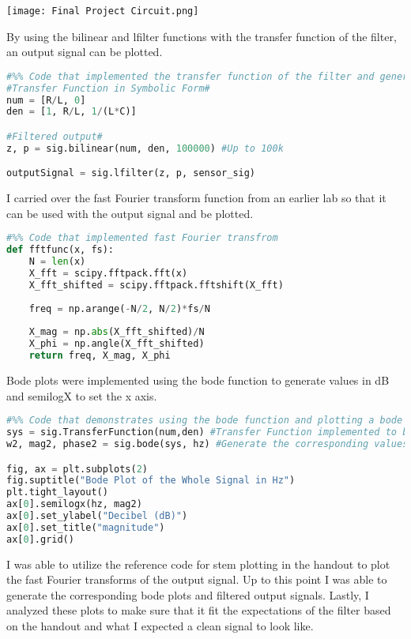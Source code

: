 \documentclass[12pt]{report}
\begin{document}
\texttt{[image: Final Project Circuit.png]}

By using the bilinear and lfilter functions with the transfer function of the filter, an output signal can be plotted. 
\begin{lstlisting}[language=Python]
#%% Code that implemented the transfer function of the filter and generated the output signal from the filter
#Transfer Function in Symbolic Form#
num = [R/L, 0]
den = [1, R/L, 1/(L*C)]

#Filtered output#
z, p = sig.bilinear(num, den, 100000) #Up to 100k

outputSignal = sig.lfilter(z, p, sensor_sig)


\end{lstlisting}

I carried over the fast Fourier transform function from an earlier lab so that it can be used with the output signal and be plotted. 
\begin{lstlisting}[language=Python]
#%% Code that implemented fast Fourier transfrom
def fftfunc(x, fs):
    N = len(x)
    X_fft = scipy.fftpack.fft(x)
    X_fft_shifted = scipy.fftpack.fftshift(X_fft)
    
    freq = np.arange(-N/2, N/2)*fs/N
    
    X_mag = np.abs(X_fft_shifted)/N
    X_phi = np.angle(X_fft_shifted)
    return freq, X_mag, X_phi
\end{lstlisting}

Bode plots were implemented using the bode function to generate values in dB and semilogX to set the x axis.
\begin{lstlisting}[language=Python]
#%% Code that demonstrates using the bode function and plotting a bode plot
sys = sig.TransferFunction(num,den) #Transfer Function implemented to be used with bode
w2, mag2, phase2 = sig.bode(sys, hz) #Generate the corresponding values for the Bode Plot

fig, ax = plt.subplots(2)
fig.suptitle("Bode Plot of the Whole Signal in Hz")
plt.tight_layout()
ax[0].semilogx(hz, mag2)
ax[0].set_ylabel("Decibel (dB)")
ax[0].set_title("magnitude")
ax[0].grid()
\end{lstlisting}

I was able to utilize the reference code for stem plotting in the handout to plot the fast Fourier transforms of the output signal. Up to this point I was able to generate the corresponding bode plots and filtered output signals. Lastly, I analyzed these plots to make sure that it fit the expectations of the filter based on the handout and what I expected a clean signal to look like. 
\end{document}
